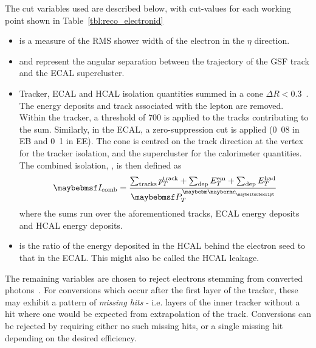 The cut variables used are described below, with cut-values for each working
point shown in Table~\ref{tbl:reco_electronid}
\begin{itemize}
\item \sigmaieta is a measure of the \ac{RMS} shower width of the electron
  in the $\eta$ direction.
\item \deltaphiin and \deltaetain represent the angular separation between the
  trajectory of the \ac{GSF} track and the \ac{ECAL} supercluster.
\item Tracker, \ac{ECAL} and \ac{HCAL} isolation quantities summed in a cone
  $\Delta R < 0.3$~\cite{lepton_isolation_an}. The energy deposits and track
  associated with the lepton are removed. Within the tracker, a threshold of
  \unit{700}{\MeV} is applied to the tracks contributing to the sum. Similarly,
  in the \ac{ECAL}, a zero-suppression cut is applied (\unit{0.08}{\GeV} in
  \ac{EB} and \unit{0.1}{\GeV} in \ac{EE}). The cone is centred on the track
  direction at the vertex for the tracker isolation, and the supercluster for
  the calorimeter quantities. The combined isolation, \CombIso, is then defined
  as
  \begin{equation*}
    \CombIso = \frac{\sum_{\textrm{tracks}} p_T^{\textrm{track}} + \sum_{\textrm{dep}}
    E_T^{\textrm{em}} + \sum_{\textrm{dep}} E_T^{\textrm{had}}}{\Pte}
   \end{equation*}
   where the sums run over the aforementioned tracks, \ac{ECAL} energy deposits
   and \ac{HCAL} energy deposits.
\item \HoverE is the ratio of the energy deposited in the \ac{HCAL} behind the
  electron seed to that in the \ac{ECAL}. This might also be called the
  \ac{HCAL} leakage.
\end{itemize}

The remaining variables are chosen to reject electrons stemming from converted
photons~\cite{cms_an_2009_159}. For conversions which occur after the first
layer of the tracker, these may exhibit a pattern of \emph{missing hits} -
i.e. layers of the inner tracker without a hit where one would be expected from
extrapolation of the track. Conversions can be rejected by requiring either no
such missing hits, or a single missing hit depending on the desired efficiency.

